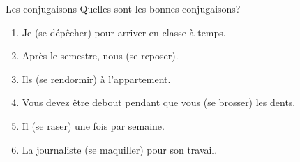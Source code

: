 \documentclass{beamer}
\begin{document}
  \begin{frame}{Les conjugaisons}
    Quelles sont les bonnes conjugaisons? \\
    \begin{enumerate}
      \item Je \underline{} (se dépêcher) pour arriver en classe à temps.
      \item Après le semestre, nous \underline{} (se reposer).
      \item Ils \underline{} (se rendormir) à l'appartement.
      \item Vous devez être debout pendant que vous \underline{} (se brosser) les dents.
      \item Il \underline{} (se raser) une fois par semaine.
      \item La journaliste \underline{} (se maquiller) pour son travail.
    \end{enumerate}
  \end{frame}
\end{document}
